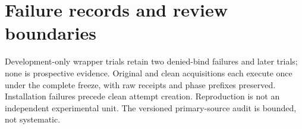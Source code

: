\section{Failure records and review boundaries}
Development-only wrapper trials retain two denied-bind failures and later trials; none is prospective evidence. Original and clean acquisitions each execute once under the complete freeze, with raw receipts and phase prefixes preserved. Installation failures precede clean attempt creation. Reproduction is not an independent experimental unit. The versioned primary-source audit is bounded, not systematic.
